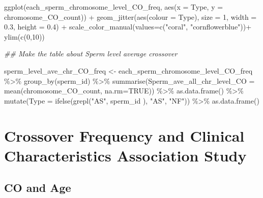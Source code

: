 \documentclass[
  letterpaper,
  DIV=11,
  numbers=noendperiod]{scrreprt}
\newenvironment{Shaded}{\begin{snugshade}}{\end{snugshade}}
\newcommand{\AttributeTok}[1]{\textcolor[rgb]{0.40,0.45,0.13}{#1}}
\newcommand{\ConstantTok}[1]{\textcolor[rgb]{0.56,0.35,0.01}{#1}}
\newcommand{\DecValTok}[1]{\textcolor[rgb]{0.68,0.00,0.00}{#1}}
\newcommand{\DocumentationTok}[1]{\textcolor[rgb]{0.37,0.37,0.37}{\textit{#1}}}
\newcommand{\FloatTok}[1]{\textcolor[rgb]{0.68,0.00,0.00}{#1}}
\newcommand{\FunctionTok}[1]{\textcolor[rgb]{0.28,0.35,0.67}{#1}}
\newcommand{\NormalTok}[1]{\textcolor[rgb]{0.00,0.23,0.31}{#1}}
\newcommand{\OtherTok}[1]{\textcolor[rgb]{0.00,0.23,0.31}{#1}}
\newcommand{\SpecialCharTok}[1]{\textcolor[rgb]{0.37,0.37,0.37}{#1}}
\newcommand{\StringTok}[1]{\textcolor[rgb]{0.13,0.47,0.30}{#1}}
\begin{document}
\begin{codelisting}
\begin{Shaded}
\begin{Highlighting}[]
\FunctionTok{ggplot}\NormalTok{(each\_sperm\_chromosome\_level\_CO\_freq, }\FunctionTok{aes}\NormalTok{(}\AttributeTok{x =}\NormalTok{ Type, }\AttributeTok{y =}\NormalTok{ chromosome\_CO\_count)) }\SpecialCharTok{+} 
  \FunctionTok{geom\_jitter}\NormalTok{(}\FunctionTok{aes}\NormalTok{(}\AttributeTok{colour =}\NormalTok{ Type), }\AttributeTok{size =} \DecValTok{1}\NormalTok{, }\AttributeTok{width =} \FloatTok{0.3}\NormalTok{, }\AttributeTok{height =} \FloatTok{0.4}\NormalTok{) }\SpecialCharTok{+} 
  \FunctionTok{scale\_color\_manual}\NormalTok{(}\AttributeTok{values=}\FunctionTok{c}\NormalTok{(}\StringTok{"coral"}\NormalTok{, }\StringTok{"cornflowerblue"}\NormalTok{))}\SpecialCharTok{+}
  \FunctionTok{ylim}\NormalTok{(}\FunctionTok{c}\NormalTok{(}\DecValTok{0}\NormalTok{,}\DecValTok{10}\NormalTok{))}
  
  
\DocumentationTok{\#\# Make the table about Sperm level average crossover}

\NormalTok{sperm\_level\_ave\_chr\_CO\_freq }\OtherTok{\textless{}{-}}\NormalTok{ each\_sperm\_chromosome\_level\_CO\_freq }\SpecialCharTok{\%\textgreater{}\%} 
  \FunctionTok{group\_by}\NormalTok{(sperm\_id) }\SpecialCharTok{\%\textgreater{}\%} 
  \FunctionTok{summarise}\NormalTok{(}\AttributeTok{Sperm\_ave\_all\_chr\_level\_CO =} \FunctionTok{mean}\NormalTok{(chromosome\_CO\_count, }\AttributeTok{na.rm=}\ConstantTok{TRUE}\NormalTok{)) }\SpecialCharTok{\%\textgreater{}\%}  \FunctionTok{as.data.frame}\NormalTok{() }\SpecialCharTok{\%\textgreater{}\%}
  \FunctionTok{mutate}\NormalTok{(}\AttributeTok{Type =} \FunctionTok{ifelse}\NormalTok{(}\FunctionTok{grepl}\NormalTok{(}\StringTok{"AS"}\NormalTok{, sperm\_id ), }\StringTok{"AS"}\NormalTok{, }\StringTok{"NF"}\NormalTok{)) }\SpecialCharTok{\%\textgreater{}\%} \FunctionTok{as.data.frame}\NormalTok{()}
\end{Highlighting}
\end{Shaded}

\end{codelisting}


\hypertarget{crossover-frequency-and-clinical-characteristics-association-study}{%
\chapter{Crossover Frequency and Clinical Characteristics Association
Study}\label{crossover-frequency-and-clinical-characteristics-association-study}}

\hypertarget{co-and-age}{%
\section{CO and Age}\label{co-and-age}}
\end{document}

